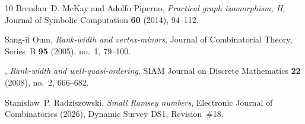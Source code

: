 \documentclass[11pt]{amsart}
\theoremstyle{definition}
\theoremstyle{remark}
\begin{document}
\begin{thebibliography}{10}
Brendan~D. McKay and Adolfo Piperno, \emph{Practical graph isomorphism, {II}},
  Journal of Symbolic Computation \textbf{60} (2014), 94--112.

Sang-il Oum, \emph{Rank-width and vertex-minors}, Journal of Combinatorial
  Theory, Series~B \textbf{95} (2005), no.~1, 79--100.

\bysame, \emph{Rank-width and well-quasi-ordering}, SIAM Journal on Discrete
  Mathematics \textbf{22} (2008), no.~2, 666--682.

Stanis{\l}aw~P. Radziszowski, \emph{Small {R}amsey numbers}, Electronic Journal
  of Combinatorics (2026), Dynamic Survey DS1, Revision~\#18.

\end{thebibliography}
\end{document}
